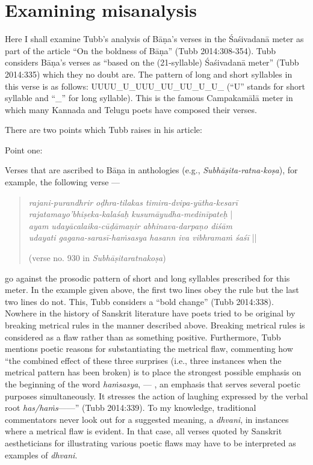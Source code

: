 \section*{Examining misanalysis}

Here I shall examine Tubb’s analysis of Bāṇa’s verses in the Śaśivadanā meter as part of the article “On the boldness of Bāṇa” (Tubb 2014:308-354). Tubb considers Bāṇa’s verses as “based on the (21-syllable) Śaśivadanā meter” (Tubb 2014:335) which they no doubt are. The pattern of long and short syllables in this verse is as follows: UUUU\_U\_UUU\_UU\_UU\_U\_U\_ (“U” stands for short syllable and “\_” for long syllable). This is the famous Campakamālā meter in which many Kannada and Telugu poets have composed their verses.

There are two points which Tubb raises in his article:

Point one: 

Verses that are ascribed to Bāṇa in anthologies (e.g., \textsl{Subhāṣita-ratna-koṣa}), for example, the following verse --- 
\begin{quote}
\textsl{rajani-purandhrir oḍhra-tilakas timira-dvipa-yūtha-kesarī}\\
\qquad \textsl{     rajatamayo’bhiṣeka-kalaśaḥ kusumāyudha-medinīpateḥ} |\\
\textsl{ayam udayācalaika-cūḍāmaṇir abhinava-darpaṇo diśām}\\
\qquad\textsl{udayati gagana-sarasī-haṁsasya hasann iva vibhramaṁ śaśī} ||

\hfill (verse no. 930 in \textsl{Subhāṣitaratnakoṣa}) 
\end{quote}
go against the prosodic pattern of short and long syllables prescribed for this meter. In the example given above, the first two lines obey the rule but the last two lines do not. This, Tubb considers a “bold change” (Tubb 2014:338). Nowhere in the history of Sanskrit literature have poets tried to be original by breaking metrical rules in the manner described above. Breaking metrical rules is considered as a flaw rather than as something positive. Furthermore, Tubb mentions poetic reasons for substantiating the metrical flaw, commenting how “the combined effect of these three surprises (i.e., three instances when the metrical pattern has been broken) is to place the strongest possible emphasis on the beginning of the word \textsl{haṁsasya}, --- , an emphasis that serves several poetic purposes simultaneously. It stresses the action of laughing expressed by the verbal root \textsl{has/haṁs}—---” (Tubb 2014:339). To my knowledge, traditional commentators never look out for a suggested meaning, a \textsl{dhvani}, in instances where a metrical flaw is evident. In that case, all verses quoted by Sanskrit aestheticians for illustrating various poetic flaws may have to be interpreted as examples of \textsl{dhvani}.

